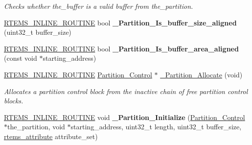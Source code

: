 \begin{DoxyCompactItemize}
\begin{DoxyCompactList}\small\item\em Checks whether the\+\_\+buffer is a valid buffer from the\+\_\+partition. \end{DoxyCompactList}\item 
\mbox{\label{group__ClassicPartImpl_ga9ea646411c12ac8c4b36cd4cd632e552}} 
\mbox{\hyperlink{group__RTEMSScoreBaseDefs_gac216239df231d5dbd15e3520b0b9313f}{R\+T\+E\+M\+S\+\_\+\+I\+N\+L\+I\+N\+E\+\_\+\+R\+O\+U\+T\+I\+NE}} bool {\bfseries \+\_\+\+Partition\+\_\+\+Is\+\_\+buffer\+\_\+size\+\_\+aligned} (uint32\+\_\+t buffer\+\_\+size)
\item 
\mbox{\label{group__ClassicPartImpl_gab04eeefef2a18191fc0beb198f3a4fb6}} 
\mbox{\hyperlink{group__RTEMSScoreBaseDefs_gac216239df231d5dbd15e3520b0b9313f}{R\+T\+E\+M\+S\+\_\+\+I\+N\+L\+I\+N\+E\+\_\+\+R\+O\+U\+T\+I\+NE}} bool {\bfseries \+\_\+\+Partition\+\_\+\+Is\+\_\+buffer\+\_\+area\+\_\+aligned} (const void $\ast$starting\+\_\+address)
\item 
\mbox{\hyperlink{group__RTEMSScoreBaseDefs_gac216239df231d5dbd15e3520b0b9313f}{R\+T\+E\+M\+S\+\_\+\+I\+N\+L\+I\+N\+E\+\_\+\+R\+O\+U\+T\+I\+NE}} \mbox{\hyperlink{structPartition__Control}{Partition\+\_\+\+Control}} $\ast$ \mbox{\hyperlink{group__ClassicPartImpl_gaf0cd3ef551cee15f50523308fa63aeed}{\+\_\+\+Partition\+\_\+\+Allocate}} (void)
\begin{DoxyCompactList}\small\item\em Allocates a partition control block from the inactive chain of free partition control blocks. \end{DoxyCompactList}\item 
\mbox{\label{group__ClassicPartImpl_ga42fbb5cec48fe5747f314e97adfa36de}} 
\mbox{\hyperlink{group__RTEMSScoreBaseDefs_gac216239df231d5dbd15e3520b0b9313f}{R\+T\+E\+M\+S\+\_\+\+I\+N\+L\+I\+N\+E\+\_\+\+R\+O\+U\+T\+I\+NE}} void {\bfseries \+\_\+\+Partition\+\_\+\+Initialize} (\mbox{\hyperlink{structPartition__Control}{Partition\+\_\+\+Control}} $\ast$the\+\_\+partition, void $\ast$starting\+\_\+address, uint32\+\_\+t length, uint32\+\_\+t buffer\+\_\+size, \mbox{\hyperlink{group__ClassicAttributes_gaea40313cf78ed843e09c4315d0a10f79}{rtems\+\_\+attribute}} attribute\+\_\+set)
\item 
\mbox{\label{group__ClassicPartImpl_ga8a14aa3dc9fea51cf1a6cf2ee920ff5a}} 

\end{DoxyCompactItemize}
